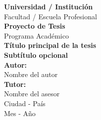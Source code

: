 \begin{titlepage}
    \centering

    {\Large \textbf{Universidad / Institución}}\\[0.3cm]
    {\large Facultad / Escuela Profesional}\\[1.8cm]


    {\Large \textbf{Proyecto de Tesis}}\\[0.2cm]
    {\large Programa Académico}\\[1.5cm]

    {\Large \textbf{Título principal de la tesis}}\\
    {\Large \textbf{Subtítulo opcional}}\\[1.5cm]

    {\large \textbf{Autor:}}\\[0.2cm]
    {\large Nombre del autor}\\[1cm]

    {\large \textbf{Tutor:}}\\[0.2cm]
    {\large Nombre del asesor}\\[1.5cm]

    {\large Ciudad - País}\\
    {\large Mes - Año}

\end{titlepage}
